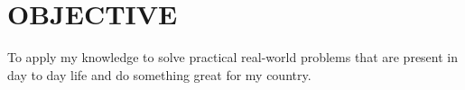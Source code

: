 \documentclass[11pt,a4paper,sans]{moderncv}
\begin{document}
	\makecvtitle
	\section{OBJECTIVE}
	To apply my knowledge to solve practical real-world problems that are present in day to day life and do something great for my country.
\end{document}
